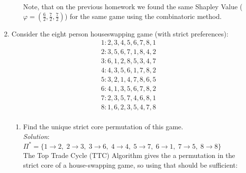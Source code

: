 \documentclass{article}
\begin{document}
\begin{enumerate}
\begin{enumerate}
  Note, that on the previous homework we found the same Shapley Value ($\varphi = (\frac{6}{2}, \frac{7}{2}, \frac{7}{2})$) for the same game using the combinatoric method. \\
  \end{enumerate}

%
\item Consider the eight person houseswapping game (with strict preferences):
\begin{align*}
1: 2,3,4,5,6,7,8,1 \\
2: 3,5,6,7,1,8,4,2 \\
3: 6,1,2,8,5,3,4,7 \\
4: 4,3,5,6,1,7,8,2 \\
5: 3,2,1,4,7,8,6,5 \\
6: 4,1,3,5,6,7,8,2 \\
7: 2,3,5,7,4,6,8,1 \\
8: 1,6,2,3,5,4,7,8 \\
\end{align*}

  \begin{enumerate}
  \item Find the unique strict core permutation of this game. \\

  \textit{Solution}: \\
  
  $\Pi^{*} = \{ 1 \rightarrow 2,\; 2 \rightarrow 3,\; 3 \rightarrow 6,\; 4 \rightarrow 4,\; 5 \rightarrow 7,\; 6 \rightarrow 1,\; 7 \rightarrow 5,\; 8 \rightarrow 8 \}$ \\

  The Top Trade Cycle (TTC) Algorithm gives the a permutation in the strict core of a house-swapping game, so using that should be sufficient: \\


\end{enumerate}
\end{enumerate}
\end{document}
